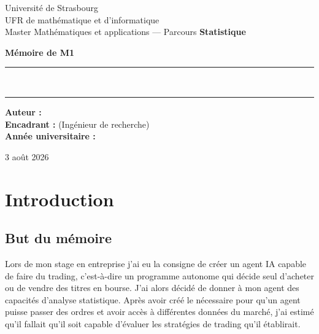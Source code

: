 \begin{titlepage}
\centering
\vspace*{1cm}

{\large Université de Strasbourg \\[0.2cm]
UFR de mathématique et d'informatique \\[0.2cm]
Master Mathématiques et applications --- Parcours \textbf{Statistique}\par}

\vfill

{\Large\bfseries Mémoire de M1\par}
\vspace{0.8cm}
\rule{\linewidth}{0.4pt}\\[0.4cm]
{\huge\bfseries \titrememoire \par}
\vspace{0.4cm}
\rule{\linewidth}{0.4pt}

\vfill

\begin{flushleft}
\textbf{Auteur :} \auteur \\[0.3cm]
\textbf{Encadrant :} \encadrant{} (Ingénieur de recherche) \\[0.3cm]
\textbf{Année universitaire :} \anneeuniv
\end{flushleft}

\vfill
{\small 3 août 2026\par}
\end{titlepage}

\tableofcontents
\cleardoublepage
{}

\chapter*{Introduction}
\label{chap:intro}

\section*{But du mémoire}
\label{sec:but}


Lors de mon stage en entreprise j'ai eu la consigne de créer un agent IA capable de faire du trading,
c'est-à-dire un programme autonome qui décide seul d'acheter ou de vendre des titres en bourse.
J'ai alors décidé de donner à mon agent des capacités d'analyse statistique.
Après avoir créé le nécessaire pour qu'un agent puisse passer des ordres et
avoir accès à différentes données du marché, j'ai estimé qu'il fallait qu'il soit capable d'évaluer
les stratégies de trading qu'il établirait.

